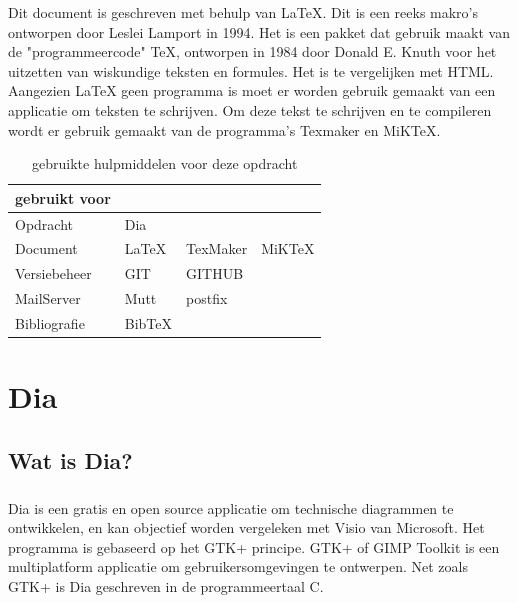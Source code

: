 \documentclass[12pt,a4paper]{report}
\begin{document}
\begin{flushleft}
Dit document is geschreven met behulp van \LaTeX{}. Dit is een reeks makro's ontworpen door Leslei Lamport in 1994. Het is een pakket dat gebruik maakt van de "programmeercode" \TeX{}, ontworpen in 1984 door Donald E. Knuth voor het uitzetten van wiskundige teksten en formules. Het is te vergelijken met HTML. Aangezien \LaTeX{} geen programma is moet er worden gebruik gemaakt van een applicatie om teksten te schrijven. Om deze tekst te schrijven en te compileren wordt er gebruik gemaakt van de programma's Texmaker en MiKTeX.

\begin{table}[H]
\begin{tabular}{|l || l  l  l|}
\hline
gebruikt voor &&& \\
\hline
Opdracht & Dia & & \\
Document & LaTeX & TexMaker & MiKTeX\\
Versiebeheer & GIT & GITHUB & \\
MailServer & Mutt & postfix & \\
Bibliografie & BibTeX & &  \\
\hline
\end{tabular}
\centering
\caption{gebruikte hulpmiddelen voor deze opdracht}
\end{table}

\tableofcontents

\chapter{Dia}
\section{Wat is Dia?}
\paragraph*{}
Dia is een gratis en open source applicatie om technische diagrammen te ontwikkelen, en kan objectief worden vergeleken met Visio van Microsoft. Het programma is gebaseerd op het GTK+ principe. GTK+ of GIMP Toolkit is een multiplatform applicatie om gebruikersomgevingen te ontwerpen. Net zoals GTK+ is Dia geschreven in de programmeertaal C. 

\end{flushleft}
\end{document}
